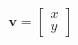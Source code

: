 \documentclass[preview]{standalone}
\begin{document}
\begin{align*}
\mathbf{v} = \begin{bmatrix} x \\ y \end{bmatrix}
\end{align*}
\end{document}
